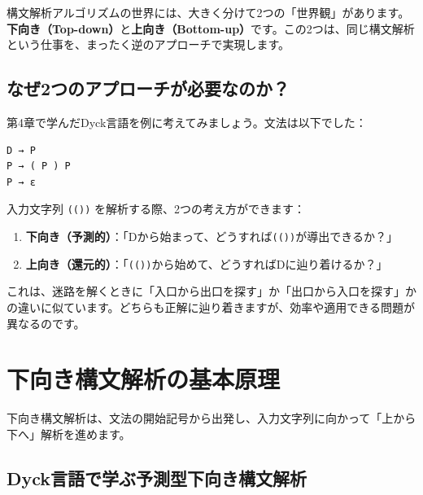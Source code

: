 構文解析アルゴリズムの世界には、大きく分けて2つの「世界観」があります。\textbf{下向き（Top-down）}と\textbf{上向き（Bottom-up）}です。この2つは、同じ構文解析という仕事を、まったく逆のアプローチで実現します。

\hypertarget{chapter5-ux306aux305c2ux3064ux306eux30a2ux30d7ux30edux30fcux30c1ux304cux5fc5ux8981ux306aux306eux304b}{%
\subsection{なぜ2つのアプローチが必要なのか？}\label{chapter5-ux306aux305c2ux3064ux306eux30a2ux30d7ux30edux30fcux30c1ux304cux5fc5ux8981ux306aux306eux304b}}

第4章で学んだDyck言語を例に考えてみましょう。文法は以下でした：

\begin{verbatim}
D → P
P → ( P ) P
P → ε
\end{verbatim}

入力文字列 \texttt{(())} を解析する際、2つの考え方ができます：

\begin{enumerate}
\def\labelenumi{\arabic{enumi}.}
\tightlist
\item
  \textbf{下向き（予測的）}：「Dから始まって、どうすれば\texttt{(())}が導出できるか？」
\item
  \textbf{上向き（還元的）}：「\texttt{(())}から始めて、どうすればDに辿り着けるか？」
\end{enumerate}

これは、迷路を解くときに「入口から出口を探す」か「出口から入口を探す」かの違いに似ています。どちらも正解に辿り着きますが、効率や適用できる問題が異なるのです。

\hypertarget{chapter5-ux4e0bux5411ux304dux69cbux6587ux89e3ux6790ux306eux57faux672cux539fux7406}{%
\section{下向き構文解析の基本原理}\label{chapter5-ux4e0bux5411ux304dux69cbux6587ux89e3ux6790ux306eux57faux672cux539fux7406}}

下向き構文解析は、文法の開始記号から出発し、入力文字列に向かって「上から下へ」解析を進めます。

\hypertarget{chapter5-dyckux8a00ux8a9eux3067ux5b66ux3076ux4e88ux6e2cux578bux4e0bux5411ux304dux69cbux6587ux89e3ux6790}{%
\subsection{Dyck言語で学ぶ予測型下向き構文解析}\label{chapter5-dyckux8a00ux8a9eux3067ux5b66ux3076ux4e88ux6e2cux578bux4e0bux5411ux304dux69cbux6587ux89e3ux6790}}

